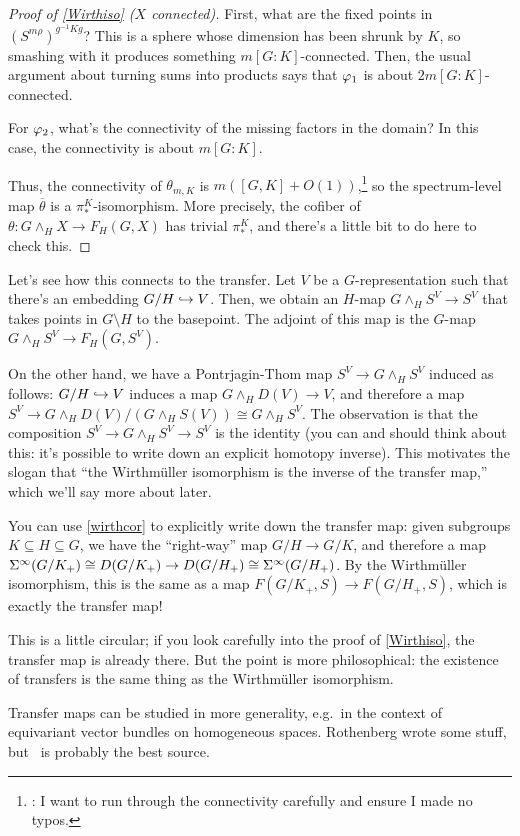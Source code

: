 \begin{proof}[Proof of \cref{Wirthiso} ($X$ connected)]
First, what are the fixed points in $(S^{m\rho})^{g^{-1}Kg}$? This is a sphere whose dimension has been shrunk by
$K$, so smashing with it produces something $m[G:K]$-connected. Then, the usual argument about turning sums into
products says that $\varphi_1$ is about $2m[G:K]$-connected.

For $\varphi_2$, what's the connectivity of the missing factors in the domain? In this case, the connectivity is about
$m[G:K]$.

Thus, the connectivity of $\theta_{m,K}$ is $m([G,K] + O(1))$,\footnote{\TODO: I want to run through the
connectivity carefully and ensure I made no typos.} so the spectrum-level map $\overline\theta$ is a
$\pi_*^K$-isomorphism. More precisely, the cofiber of $\theta\colon G\wedge_H X\to F_H(G,X)$ has trivial $\pi_*^K$,
and there's a little bit to do here to check this.
\end{proof}
\begin{rem}
Let's see how this connects to the transfer. Let $V$ be a $G$-representation such that there's an embedding
$G/H\hookrightarrow V$. Then, we obtain an $H$-map $G\wedge_H S^V\to S^V$ that takes points in $G\setminus H$ to the
basepoint. The adjoint of this map is the $G$-map $G\wedge_H S^V\to F_H(G,S^V)$.

On the other hand, we have a Pontrjagin-Thom map $S^V\to G\wedge_H S^V$ induced as follows: $G/H\hookrightarrow V$ induces a
map $G\wedge_H D(V)\to V$, and therefore a map $S^V\to G\wedge_H D(V)/(G\wedge_H S(V))\cong G\wedge_H S^V$. The
observation is that the composition $S^V\to G\wedge_H S^V\to S^V$ is the identity (you can and should think about
this: it's possible to write down an explicit homotopy inverse). This motivates the slogan that ``the Wirthmüller
isomorphism is the inverse of the transfer map,'' which we'll say more about later.
\end{rem}
You can use \cref{wirthcor} to explicitly write down the transfer map: given subgroups $K\subseteq H\subseteq G$,
we have the ``right-way'' map $G/H\to G/K$, and therefore a map $\Sigma^\infty(G/K_+)\cong D(G/K_+)\to
D(G/H_+)\cong\Sigma^\infty(G/H_+)$. By the Wirthmüller isomorphism, this is the same as a map $F(G/K_+,S)\to F(G/H_+,S)$,
which is exactly the transfer map!

This is a little circular; if you look carefully into the proof of \cref{Wirthiso}, the transfer map is already
there. But the point is more philosophical: the existence of transfers is the same thing as the Wirthmüller
isomorphism.
\begin{rem}
Transfer maps can be studied in more generality, e.g.\ in the context of equivariant vector bundles on homogeneous
spaces. Rothenberg wrote some stuff, but~\cite{LMS} is probably the best source.
\end{rem}
